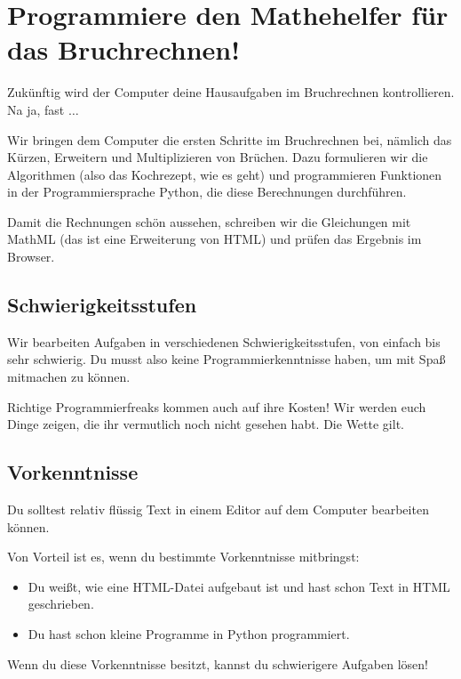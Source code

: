 \section{Programmiere den Mathehelfer für das Bruchrechnen!}

Zukünftig wird der Computer deine Hausaufgaben im Bruchrechnen kontrollieren. Na ja, fast $\dots$

Wir bringen dem Computer die ersten Schritte im Bruchrechnen bei, nämlich das Kürzen, Erweitern und Multiplizieren von Brüchen. Dazu formulieren wir die Algorithmen (also das Kochrezept, wie es geht) und programmieren Funktionen in der Programmiersprache Python, die diese Berechnungen durchführen.

Damit die Rechnungen schön aussehen, schreiben wir die Gleichungen mit MathML (das ist eine Erweiterung von HTML) und prüfen das Ergebnis im Browser.

\subsection*{Schwierigkeitsstufen}

Wir bearbeiten Aufgaben in verschiedenen Schwierigkeitsstufen, von einfach bis sehr schwierig. Du musst also keine Programmierkenntnisse haben, um mit Spaß mitmachen zu können.

Richtige Programmierfreaks kommen auch auf ihre Kosten! Wir werden euch Dinge zeigen, die ihr vermutlich noch nicht gesehen habt. Die Wette gilt.

\subsection*{Vorkenntnisse}

Du solltest relativ flüssig Text in einem Editor auf dem Computer bearbeiten können.

Von Vorteil ist es, wenn du bestimmte Vorkenntnisse mitbringst:
\begin{itemize}
	\item Du weißt, wie eine HTML-Datei aufgebaut ist und hast schon Text in HTML geschrieben.
	\item Du hast schon kleine Programme in Python programmiert.
\end{itemize}

Wenn du diese Vorkenntnisse besitzt, kannst du schwierigere Aufgaben lösen!

